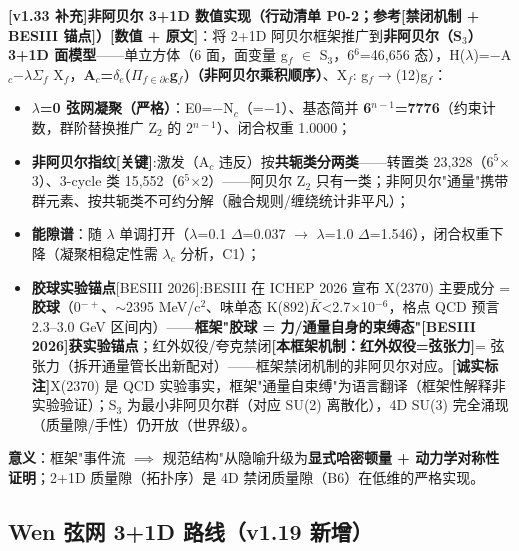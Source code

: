 \documentclass[UTF8,fontset=windows]{csoarticle}
\newcommand{\mtag}[1]{\textbf{[#1]}}
\newcommand{\up}[1]{\ensuremath{^{#1}}}
\newcommand{\down}[1]{\ensuremath{_{#1}}}
\begin{document}
\textbf{\mtag{v1.33 补充}非阿贝尔 3+1D 数值实现（行动清单 P0-2；参考\mtag{禁闭机制 + BESIII 锚点}）}\mtag{数值 + 原文}：将 2+1D 阿贝尔框架推广到\textbf{非阿贝尔（S\down{3}）3+1D 面模型}------单立方体（6 面，面变量 g\down{f} \ensuremath{\in} S\down{3}，6\up{6}=46,656 态），H(\ensuremath{\lambda})=\ensuremath{-}A\down{c}\ensuremath{-}\ensuremath{\lambda}\ensuremath{\Sigma}\down{f} X\down{f}，\textbf{A\down{c}=\ensuremath{\delta}\down{e}(\ensuremath{\Pi}\down{f\in{}\partial{}c}g\down{f})（非阿贝尔乘积顺序）}、X\down{f}: g\down{f}\ensuremath{\to}(12)g\down{f}：
\begin{itemize}
\item \textbf{\ensuremath{\lambda}=0 弦网凝聚（严格）}：E0=\ensuremath{-}N\down{c}（=\ensuremath{-}1）、基态简并 \textbf{6\up{n-1}=7776}（约束计数，群阶替换推广 Z\down{2} 的 2\up{n-1}）、闭合权重 1.0000；
\item \textbf{非阿贝尔指纹\mtag{关键}}:激发（A\down{c} 违反）按\textbf{共轭类分两类}------转置类 23,328（6\up{5}\ensuremath{\times}3）、3-cycle 类 15,552（6\up{5}\ensuremath{\times}2）------阿贝尔 Z\down{2} 只有一类；非阿贝尔"通量"携带群元素、按共轭类不可约分解（融合规则/缠绕统计非平凡）；
\item \textbf{能隙谱}：随 \ensuremath{\lambda} 单调打开（\ensuremath{\lambda}=0.1 \ensuremath{\Delta}=0.037 \ensuremath{\to} \ensuremath{\lambda}=1.0 \ensuremath{\Delta}=1.546），闭合权重下降（凝聚相稳定性需 \ensuremath{\lambda}\down{c} 分析，C1）；
\item \textbf{胶球实验锚点}[BESIII 2026]:BESIII 在 ICHEP 2026 宣布 X(2370) 主要成分 = \textbf{胶球}（0\up{-+}、\ensuremath{\sim}2395 MeV/c\up{2}、味单态 K(892)\ensuremath{\bar{K}}<2.7\ensuremath{\times}10\up{-6}，格点 QCD 预言 2.3--3.0 GeV 区间内）------\textbf{框架"胶球 = 力/通量自身的束缚态"[BESIII 2026]获实验锚点}；红外奴役/夸克禁闭\mtag{本框架机制：红外奴役=弦张力}= 弦张力（拆开通量管长出新配对）------框架禁闭机制的非阿贝尔对应。\mtag{诚实标注}X(2370) 是 QCD 实验事实，框架"通量自束缚"为语言翻译（框架性解释非实验验证）；S\down{3} 为最小非阿贝尔群（对应 SU(2) 离散化），4D SU(3) 完全涌现（质量隙/手性）仍开放（世界级）。
\end{itemize}

\textbf{意义}：框架"事件流 \ensuremath{\implies} 规范结构"从隐喻升级为\textbf{显式哈密顿量 + 动力学对称性证明}；2+1D 质量隙（拓扑序）是 4D 禁闭质量隙（B6）在低维的严格实现。

\subsection{Wen 弦网 3+1D 路线（v1.19 新增）}
\end{document}
